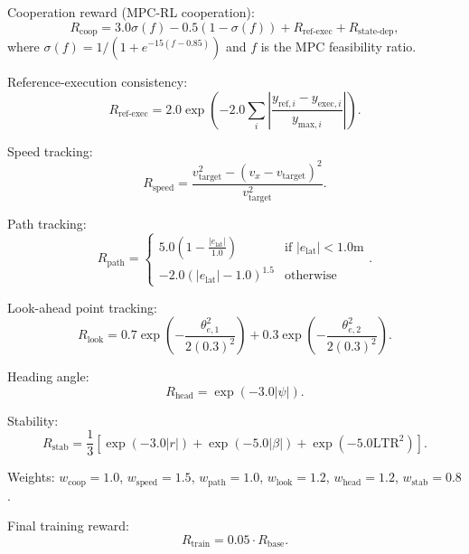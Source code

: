 \documentclass[journal]{IEEEtran}
\begin{document}
	Cooperation reward (MPC-RL cooperation):
	\begin{equation}
		R_{\text{coop}} = 3.0\sigma(f) - 0.5(1-\sigma(f)) + R_{\text{ref-exec}} + R_{\text{state-dep}},
	\end{equation}
	where $\sigma(f) = 1/(1+e^{-15(f-0.85)})$ and $f$ is the MPC feasibility ratio.
	
	Reference-execution consistency:
	\begin{equation}
		R_{\text{ref-exec}} = 2.0\exp\left(-2.0\sum_{i}\left|\frac{y_{\text{ref},i} - y_{\text{exec},i}}{y_{\text{max},i}}\right|\right).
	\end{equation}
	
	Speed tracking:
	\begin{equation}
		R_{\text{speed}} = \frac{v_{\text{target}}^2 - (v_x-v_{\text{target}})^2}{v_{\text{target}}^2}.
	\end{equation}
	
	Path tracking:
	\begin{equation}
		R_{\text{path}} = 
		\begin{cases}
			5.0\left(1-\frac{|e_{\text{lat}}|}{1.0}\right) & \text{if } |e_{\text{lat}}| < 1.0\text{m} \\
			-2.0(|e_{\text{lat}}|-1.0)^{1.5} & \text{otherwise}
		\end{cases}.
	\end{equation}
	
	Look-ahead point tracking:
	\begin{equation}
		R_{\text{look}} = 0.7\exp\left(-\frac{\theta_{e,1}^2}{2(0.3)^2}\right) + 0.3\exp\left(-\frac{\theta_{e,2}^2}{2(0.3)^2}\right).
	\end{equation}
	
	Heading angle:
	\begin{equation}
		R_{\text{head}} = \exp(-3.0|\psi|).
	\end{equation}
	
	Stability:
	\begin{equation}
		R_{\text{stab}} = \frac{1}{3}[\exp(-3.0|r|) + \exp(-5.0|\beta|) + \exp(-5.0\text{LTR}^2)].
	\end{equation}
	
	Weights: $w_{\text{coop}}=1.0$, $w_{\text{speed}}=1.5$, $w_{\text{path}}=1.0$, $w_{\text{look}}=1.2$, $w_{\text{head}}=1.2$, $w_{\text{stab}}=0.8$.
	
	Final training reward:
	\begin{equation}
		R_{\text{train}} = 0.05 \cdot R_{\text{base}}.
	\end{equation}
	
\end{document}
